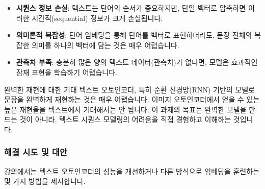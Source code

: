 \documentclass[11pt,a4paper]{article}
\begin{document}
\begin{itemize}
    \item \textbf{시퀀스 정보 손실}: 텍스트는 단어의 순서가 중요하지만, 단일 벡터로 압축하면 이러한 시간적(sequential) 정보가 크게 손실됩니다.
    \item \textbf{의미론적 복잡성}: 단어 임베딩을 통해 단어를 벡터로 표현하더라도, 문장 전체의 복잡한 의미를 하나의 벡터에 담는 것은 매우 어렵습니다.
    \item \textbf{관측치 부족}: 충분히 많은 양의 텍스트 데이터(관측치)가 없다면, 모델은 효과적인 잠재 표현을 학습하기 어렵습니다.
\end{itemize}

\begin{cautionbox}{완벽한 재현에 대한 기대}
텍스트 오토인코더, 특히 순환 신경망(RNN) 기반의 모델로 문장을 완벽하게 재현하는 것은 매우 어렵습니다. 이미지 오토인코더에서 얻을 수 있는 높은 재현율을 텍스트에서 기대해서는 안 됩니다. 이 과제의 목표는 완벽한 모델을 만드는 것이 아니라, 텍스트 시퀀스 모델링의 어려움을 직접 경험하고 이해하는 것입니다.
\end{cautionbox}

\subsubsection{해결 시도 및 대안}
강의에서는 텍스트 오토인코더의 성능을 개선하거나 다른 방식으로 임베딩을 훈련하는 몇 가지 방법을 제시합니다.
\end{document}
